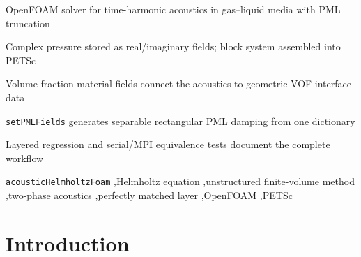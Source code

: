 \documentclass[final,12pt,nopreprintline]{elsarticle}
\newcounter{bla}
\newenvironment{refnummer}{%
\list{[\arabic{bla}]}%
{\usecounter{bla}%
 \setlength{\itemindent}{0pt}%
 \setlength{\topsep}{0pt}%
 \setlength{\itemsep}{0pt}%
 \setlength{\labelsep}{2pt}%
 \setlength{\listparindent}{0pt}%
 \settowidth{\labelwidth}{[9]}%
 \setlength{\leftmargin}{\labelwidth}%
 \addtolength{\leftmargin}{\labelsep}%
 \setlength{\rightmargin}{0pt}}}
 {\endlist}
\begin{document}
\begin{frontmatter}
\begin{abstract}
\begin{small}
\begin{refnummer}
\item C.~Xu, J.~Liu, J.~H.~D\"orsam, M.~Kupnik, T.~Mari\'{c}, D.~Bothe, An
unstructured finite-volume Helmholtz method with perfectly matched layers for
heterogeneous two-phase acoustics, arXiv:2610.01593 (2026).
\item H.~G. Weller, G.~Tabor, H.~Jasak, C.~Fureby, A tensorial approach to
computational continuum mechanics using object-oriented techniques, Comput.
Phys. 12 (1998) 620--631.
\item S.~Balay et~al., PETSc/TAO Users Manual, ANL-21/39 Rev.~3.25, Argonne
National Laboratory (2026).
\item P.~R. Amestoy, I.~S. Duff, J.-Y. L'Excellent, J.~Koster, A fully
asynchronous multifrontal solver using distributed dynamic scheduling, SIAM J.
Matrix Anal. Appl. 23 (2001) 15--41.
\end{refnummer}
\end{small}
\end{abstract}

\begin{highlights}
\item OpenFOAM solver for time-harmonic acoustics in gas--liquid media with PML truncation
\item Complex pressure stored as real/imaginary fields; block system assembled into PETSc
\item Volume-fraction material fields connect the acoustics to geometric VOF interface data
\item \texttt{setPMLFields} generates separable rectangular PML damping from one dictionary
\item Layered regression and serial/MPI equivalence tests document the complete workflow
\end{highlights}

\begin{keyword}
\texttt{acousticHelmholtzFoam} \sep Helmholtz equation \sep unstructured
finite-volume method \sep two-phase acoustics \sep perfectly matched layer
\sep OpenFOAM \sep PETSc
\end{keyword}

\end{frontmatter}

\linenumbers

\section{Introduction}
\label{sec:intro}
\end{document}
